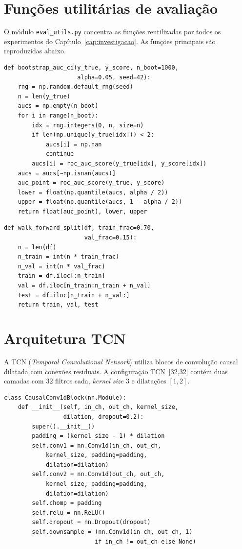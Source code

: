 \documentclass[
    12pt,
    openright,
    oneside,
    a4paper,
    english,
    brazil
]{abntex2}
\begin{document}
\begin{apendicesenv}

\chapter{Funções utilitárias de avaliação}\label{ap:evalutils}

O módulo \texttt{eval\_utils.py} concentra as funções reutilizadas por todos os experimentos do Capítulo~\ref{cap:investigacao}. As funções principais são reproduzidas abaixo.

\begin{lstlisting}[caption={Intervalo de confiança \textit{bootstrap} para ROC-AUC.},label={lst:bootstrap}]
def bootstrap_auc_ci(y_true, y_score, n_boot=1000,
                     alpha=0.05, seed=42):
    rng = np.random.default_rng(seed)
    n = len(y_true)
    aucs = np.empty(n_boot)
    for i in range(n_boot):
        idx = rng.integers(0, n, size=n)
        if len(np.unique(y_true[idx])) < 2:
            aucs[i] = np.nan
            continue
        aucs[i] = roc_auc_score(y_true[idx], y_score[idx])
    aucs = aucs[~np.isnan(aucs)]
    auc_point = roc_auc_score(y_true, y_score)
    lower = float(np.quantile(aucs, alpha / 2))
    upper = float(np.quantile(aucs, 1 - alpha / 2))
    return float(auc_point), lower, upper
\end{lstlisting}

\begin{lstlisting}[caption={Split temporal walk-forward 70/15/15.},label={lst:walkforward}]
def walk_forward_split(df, train_frac=0.70,
                       val_frac=0.15):
    n = len(df)
    n_train = int(n * train_frac)
    n_val = int(n * val_frac)
    train = df.iloc[:n_train]
    val = df.iloc[n_train:n_train + n_val]
    test = df.iloc[n_train + n_val:]
    return train, val, test
\end{lstlisting}

\chapter{Arquitetura TCN}\label{ap:tcn}

A TCN (\textit{Temporal Convolutional Network}) utiliza blocos de convolução causal dilatada com conexões residuais. A configuração TCN~[32,32] contém duas camadas com 32 filtros cada, \textit{kernel size} 3 e dilatações $[1, 2]$.

\begin{lstlisting}[caption={Bloco convolucional causal da TCN.},label={lst:tcn}]
class CausalConv1dBlock(nn.Module):
    def __init__(self, in_ch, out_ch, kernel_size,
                 dilation, dropout=0.2):
        super().__init__()
        padding = (kernel_size - 1) * dilation
        self.conv1 = nn.Conv1d(in_ch, out_ch,
            kernel_size, padding=padding,
            dilation=dilation)
        self.conv2 = nn.Conv1d(out_ch, out_ch,
            kernel_size, padding=padding,
            dilation=dilation)
        self.chomp = padding
        self.relu = nn.ReLU()
        self.dropout = nn.Dropout(dropout)
        self.downsample = (nn.Conv1d(in_ch, out_ch, 1)
                          if in_ch != out_ch else None)


\end{lstlisting}
\end{apendicesenv}
\end{document}
